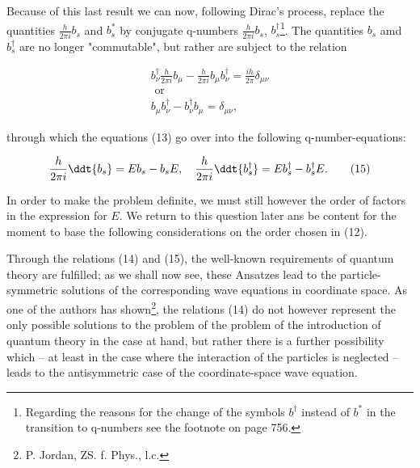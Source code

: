 \documentclass{article}
\newcommand{\nequ}[2]{
\begin{align*}
#1
\tag{#2}
\end{align*}
}
\begin{document}
Because of this last result we can now, following Dirac's process, replace the quantities $\frac{h}{2\pi i}b_s$ and $b^*_s$ by conjugate q-numbers $\frac{h}{2\pi i}b_s$, $b^\dagger_s$\footnote{Regarding the reasons for the change of the symbols $b^\dagger$ instead of $b^*$ in the transition to q-numbers see the footnote on page 756.}. The quantities $b_s$ amd $b^\dagger_s$ are no longer "commutable", but rather are subject to the relation
\nequ{
b^\dagger_\nu \frac{h}{2\pi i}b_\mu - \frac{h}{2\pi i}b_\mu b^\dagger_\nu = \frac{i h}{2\pi}\delta_{\mu\nu}\\
\text{ or } \\
b_\mu b^\dagger_\nu - b^\dagger_\nu b_\mu = \delta_{\mu\nu},
}{14}
through which the equations (13) go over into the following q-number-equations:
\nequ{
\frac{h}{2\pi i}\ddt{b_s} = E b_s - b_s E,\quad
\frac{h}{2\pi i}\ddt{b^\dagger_s} = E b^\dagger_s - b^\dagger_s E.
}{15}

In order to make the problem definite, we must still however  the order of factors in the expression for $E$. We return to this question later ans be content for the moment to base the following considerations on the order chosen in (12).

Through the relations (14) and (15), the well-known requirements of quantum theory are fulfilled; as we shall now see, these Ansatzes lead to the particle-symmetric solutions of the corresponding wave equations in coordinate space. As one of the authors has shown\footnote{P. Jordan, ZS. f. Phys., l.c.}, the relations (14) do not however represent the only possible solutions to the problem of the problem of the introduction of quantum theory in the case at hand, but rather there is a further possibility which -- at least in the case where the interaction of the particles is neglected -- leads to the antisymmetric case of the coordinate-space wave equation.
\end{document}
